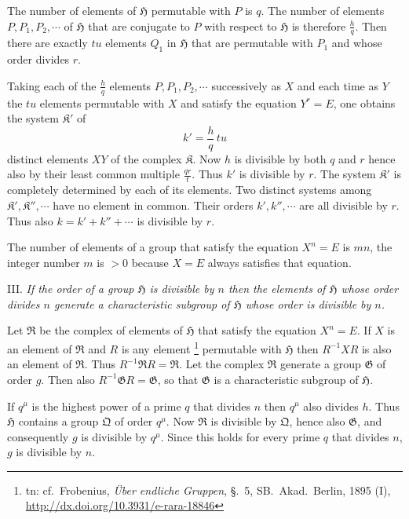 \documentclass[a5paper,12pt]{article}
\let\fr\mathfrak
\newcommand{\CG}{\fr{G}}
\newcommand{\CH}{\fr{H}}
\newcommand{\CK}{\fr{K}}
\newcommand{\CQ}{\fr{Q}}
\newcommand{\CR}{\fr{R}}
\newcommand{\?}{{\color{blue}${}^{(?)}$}}
\newcounter{origpagecounter}{}
\newcommand{\origpagebreak}{\mark{\arabic{origpagecounter}}\addtocounter{origpagecounter}{1}\mark{\arabic{origpagecounter}}}
\begin{document}
The number of elements of $\CH$
permutable with $P$ is $q$.
%
%
The number of elements $P, P_1, P_2, \cdots$
of $\CH$
that are conjugate to $P$
with respect to $\CH$ 
is therefore $\frac{h}{q}$.
%
%
Then there are exactly $t u$
elements $Q_1$ in $\CH$
that are permutable with $P_1$
and
whose order divides $r$.
%
%
\origpagebreak
%
%
Taking
each of the $\frac{h}{q}$ elements
$P, P_1, P_2, \cdots$
successively as $X$
and
each time
as $Y$
the $t u$ elements permutable with $X$
and
satisfy the equation $Y^r = E$,
one obtains
the system
$\CK'$
of %
\[
	k' = \frac{h}{q} \, t u
\]
distinct elements $X Y$ of the complex $\CK$.
%
%
Now $h$ is divisible 
by both $q$ and $r$
hence
also by their
least common multiple $\frac{q r}{t}$.
%
%
Thus $k'$ is divisible by $r$.
%
%
The system $\CK'$
is completely determined
by each of its elements.
%
%
Two distinct systems 
among $\CK', \CK'', \cdots$
have no element in common.
%
%
Their orders $k', k'', \cdots$
are all divisible by $r$.
%
%
Thus also $k = k' + k'' + \cdots$ is
divisible by $r$.


The number of elements of a group
that satisfy the equation $X^n = E$
is $m n$,
the integer number $m$ is $> 0$
because
$X = E$ always satisfies that equation.


III.
%
\label{t:2-3}
%
\emph{ %
If the order of a group $\CH$ is divisible by $n$
then
the elements of $\CH$
whose order divides $n$
generate
a characteristic subgroup
of $\CH$
whose order is divisible by $n$.
}


Let $\CR$ be the complex of elements of $\CH$
that satisfy the equation $X^n = E$.
%
%
If $X$ is an element of $\CR$
and $R$ is any element%
\footnote{%
	\scriptsize
	tn: cf.~Frobenius,
	\emph{\"Uber endliche Gruppen}, \S.~5,
	SB.~Akad.~Berlin,
	1895 (I),
	\href{http://dx.doi.org/10.3931/e-rara-18846}{http://dx.doi.org/10.3931/e-rara-18846}
}
permutable
with $\CH$
then
$R^{-1} X R$ 
is also an element of $\CR$.
%
%
Thus $R^{-1} \CR R = \CR$.
%
%
Let the complex $\CR$ generate a group $\CG$
of order $g$.
%
%
Then also $R^{-1} \CG R = \CG$,
so that
$\CG$ is a characteristic subgroup of $\CH$.


If $q^\mu$ is the highest power 
of a prime $q$
that divides $n$
then $q^\mu$ also divides $h$.
%
%
Thus $\CH$ contains a group $\CQ$ of order $q^\mu$.
%
%
Now $\CR$ is divisible by $\CQ$,
hence also $\CG$,
and consequently
$g$ is divisible by $q^\mu$.
%
%
Since this holds for every prime $q$ that divides $n$,
$g$ is divisible by $n$.
\end{document}
